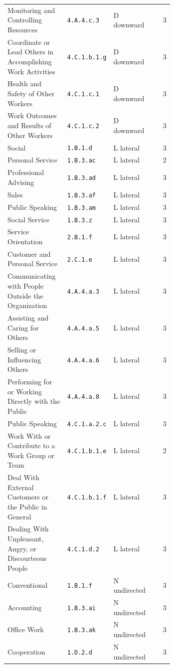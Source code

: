 \begin{longtable}[]{@{}p{0.36\linewidth}p{0.15\linewidth}p{0.15\linewidth}cr@{}}
Monitoring and Controlling Resources & \texttt{4.A.4.c.3} & D downward & & 3 \\
Coordinate or Lead Others in Accomplishing Work Activities & \texttt{4.C.1.b.1.g} & D downward & & 3 \\
Health and Safety of Other Workers & \texttt{4.C.1.c.1} & D downward & & 3 \\
Work Outcomes and Results of Other Workers & \texttt{4.C.1.c.2} & D downward & & 3 \\
Social & \texttt{1.B.1.d} & L lateral & & 3 \\
Personal Service & \texttt{1.B.3.ac} & L lateral & & 2 \\
Professional Advising & \texttt{1.B.3.ad} & L lateral & & 3 \\
Sales & \texttt{1.B.3.af} & L lateral & & 3 \\
Public Speaking & \texttt{1.B.3.am} & L lateral & & 3 \\
Social Service & \texttt{1.B.3.z} & L lateral & & 3 \\
Service Orientation & \texttt{2.B.1.f} & L lateral & & 3 \\
Customer and Personal Service & \texttt{2.C.1.e} & L lateral & & 3 \\
Communicating with People Outside the Organization & \texttt{4.A.4.a.3} & L lateral & & 3 \\
Assisting and Caring for Others & \texttt{4.A.4.a.5} & L lateral & & 3 \\
Selling or Influencing Others & \texttt{4.A.4.a.6} & L lateral & & 3 \\
Performing for or Working Directly with the Public & \texttt{4.A.4.a.8} & L lateral & & 3 \\
Public Speaking & \texttt{4.C.1.a.2.c} & L lateral & & 3 \\
Work With or Contribute to a Work Group or Team & \texttt{4.C.1.b.1.e} & L lateral & & 2 \\
Deal With External Customers or the Public in General & \texttt{4.C.1.b.1.f} & L lateral & & 3 \\
Dealing With Unpleasant, Angry, or Discourteous People & \texttt{4.C.1.d.2} & L lateral & & 3 \\
Conventional & \texttt{1.B.1.f} & N undirected & & 3 \\
Accounting & \texttt{1.B.3.ai} & N undirected & & 3 \\
Office Work & \texttt{1.B.3.ak} & N undirected & & 3 \\
Cooperation & \texttt{1.D.2.d} & N undirected & & 3 \\

\end{longtable}
